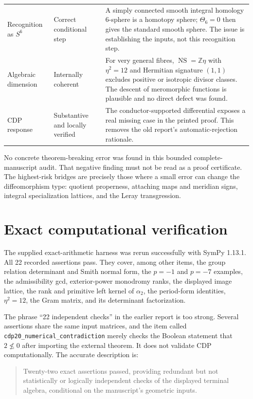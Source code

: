 \documentclass[11pt]{article}
\newcommand{\Z}{\mathbb Z}
\newcommand{\NS}{\operatorname{NS}}
\begin{document}
\begin{longtable}{@{}p{}p{}p{}@{}}
Recognition as $S^6$ & Correct conditional step & A simply connected smooth integral homology $6$-sphere is a homotopy sphere; $\Theta_6=0$ then gives the standard smooth sphere. The issue is establishing the inputs, not this recognition step. \\
Algebraic dimension & Internally coherent & For very general fibres, $\NS=\Z\eta$ with $\eta^2=12$ and Hermitian signature $(1,1)$ excludes positive or isotropic divisor classes. The descent of meromorphic functions is plausible and no direct defect was found. \\
CDP response & Substantive and locally verified & The conductor-supported differential exposes a real missing case in the printed proof. This removes the old report's automatic-rejection rationale. \\
\bottomrule
\end{longtable}

No concrete theorem-breaking error was found in this bounded complete-manuscript audit. That negative finding must not be read as a proof certificate. The highest-risk bridges are precisely those where a small error can change the diffeomorphism type: quotient properness, attaching maps and meridian signs, integral specialization lattices, and the Leray transgression.

\section{Exact computational verification}

The supplied exact-arithmetic harness was rerun successfully with SymPy 1.13.1. All 22 recorded assertions pass. They cover, among other items, the group relation determinant and Smith normal form, the $p=-1$ and $p=-7$ examples, the admissibility gcd, exterior-power monodromy ranks, the displayed image lattice, the rank and primitive left kernel of $\alpha_2$, the period-form identities, $\eta^2=12$, the Gram matrix, and its determinant factorization.

The phrase ``22 independent checks'' in the earlier report is too strong. Several assertions share the same input matrices, and the item called \texttt{cdp20\_numerical\_contradiction} merely checks the Boolean statement that $2\nleq0$ after importing the external theorem. It does not validate CDP computationally. The accurate description is:

\begin{quote}
Twenty-two exact assertions passed, providing redundant but not statistically or logically independent checks of the displayed terminal algebra, conditional on the manuscript's geometric inputs.
\end{quote}
\end{document}
